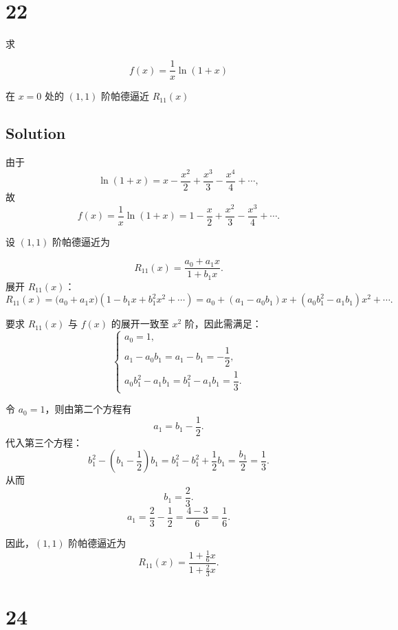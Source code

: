 \documentclass[11pt]{article}
\begin{document}
    \begin{center}
    \end{center}
    { \hspace*{\fill} \\}
    
    \section{22}\label{section}

求

\[
f(x) = \frac{1}{x} \ln (1 + x)
\]

在 \(x = 0\) 处的 \((1, 1)\) 阶帕德逼近 \(R_{11}(x)\)

\subsection{Solution}\label{solution}

由于 \[
\ln(1+x)= x -\frac{x^2}{2}+\frac{x^3}{3}-\frac{x^4}{4}+\cdots,
\] 故 \[
f(x)=\frac{1}{x}\ln(1+x) = 1-\frac{x}{2}+\frac{x^2}{3}-\frac{x^3}{4}+\cdots.
\]

设 \((1,1)\) 阶帕德逼近为

\[
R_{11}(x)=\frac{a_0+a_1 x}{1+b_1 x}.
\] 展开 \(R_{11}(x)\)： \[
R_{11}(x)= \bigl(a_0+a_1x\bigr)\left(1-b_1x+b_1^2x^2+\cdots\right)
= a_0 + (a_1-a_0b_1)x + (a_0b_1^2-a_1b_1)x^2+\cdots.
\]

要求 \(R_{11}(x)\) 与 \(f(x)\) 的展开一致至 \(x^2\) 阶，因此需满足： \[
\begin{cases}
a_0=1,\\[1mm]
a_1-a_0b_1=a_1-b_1=-\dfrac{1}{2},\\[1mm]
a_0b_1^2-a_1b_1=b_1^2-a_1b_1=\dfrac{1}{3}.
\end{cases}
\]

令 \(a_0=1\)，则由第二个方程有 \[
a_1=b_1-\frac{1}{2}.
\] 代入第三个方程： \[
b_1^2-\left(b_1-\frac{1}{2}\right)b_1 = b_1^2 - b_1^2+\frac{1}{2}b_1 = \frac{b_1}{2}=\frac{1}{3}.
\] 从而 \[
b_1=\frac{2}{3}.
\] \[
a_1=\frac{2}{3}-\frac{1}{2}=\frac{4-3}{6}=\frac{1}{6}.
\]

因此，\((1,1)\) 阶帕德逼近为 \[
\boxed{R_{11}(x)=\frac{1+\frac{1}{6}x}{1+\frac{2}{3}x}.}
\]

    \section{24}\label{section}
\end{document}

